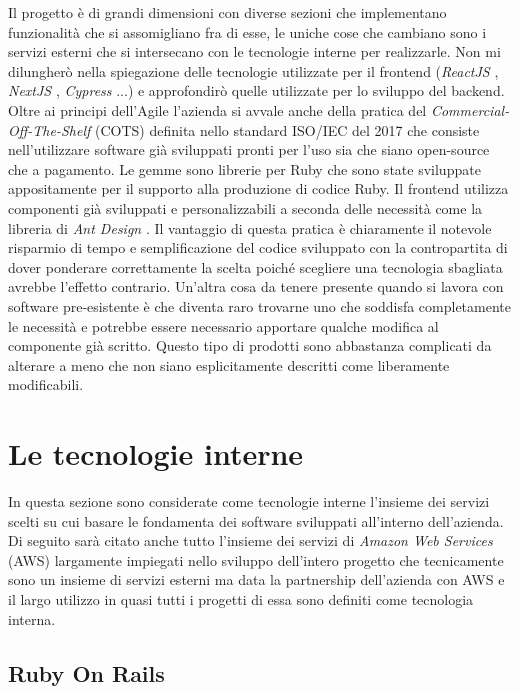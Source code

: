 \documentclass[target=bach,aauheader=,style=]{thud}
\begin{document}
Il progetto è di grandi dimensioni con diverse sezioni che implementano funzionalità che si assomigliano fra di esse, le uniche cose che cambiano
sono i servizi esterni che si intersecano con le tecnologie interne per realizzarle.
Non mi dilungherò nella spiegazione delle tecnologie utilizzate per il frontend (\textit{ReactJS} \cite{react_dev_home}, \textit{NextJS} \cite{nextjs_home},
\textit{Cypress} \cite{cypress}...) e approfondirò quelle utilizzate per lo sviluppo del backend.
Oltre ai principi dell'Agile l'azienda si avvale anche della pratica del \textit{Commercial-Off-The-Shelf} (COTS) definita nello standard ISO/IEC del 2017 \cite{iso_iec_12207_2017}
che consiste nell'utilizzare software già sviluppati pronti per l'uso sia che siano open-source che a pagamento. Le gemme sono librerie per Ruby che sono state sviluppate appositamente
per il supporto alla produzione di codice Ruby. Il frontend utilizza componenti già sviluppati e personalizzabili a seconda delle necessità come la libreria di \textit{Ant Design} \cite{antdesign}.
Il vantaggio di questa pratica è chiaramente il notevole risparmio di tempo e semplificazione del codice sviluppato con la
contropartita di dover ponderare correttamente la scelta poiché scegliere una tecnologia sbagliata avrebbe l'effetto contrario. Un'altra cosa da tenere presente quando si
lavora con software pre-esistente è che diventa raro trovarne uno che soddisfa completamente le necessità e potrebbe essere necessario apportare qualche modifica al
componente già scritto. Questo tipo di prodotti sono abbastanza complicati da alterare a meno che non siano esplicitamente descritti come liberamente modificabili.

\section{Le tecnologie interne}

In questa sezione sono considerate come tecnologie interne l'insieme dei servizi scelti su cui basare le fondamenta dei software
sviluppati all'interno dell'azienda. Di seguito sarà citato anche tutto l'insieme dei servizi di \textit{Amazon Web Services} \cite{aws} (AWS)
largamente impiegati nello sviluppo dell'intero progetto che tecnicamente sono un insieme di servizi esterni ma data la partnership dell'azienda con AWS
e il largo utilizzo in quasi tutti i progetti di essa sono definiti come tecnologia interna.

\subsection{Ruby On Rails}
\end{document}
